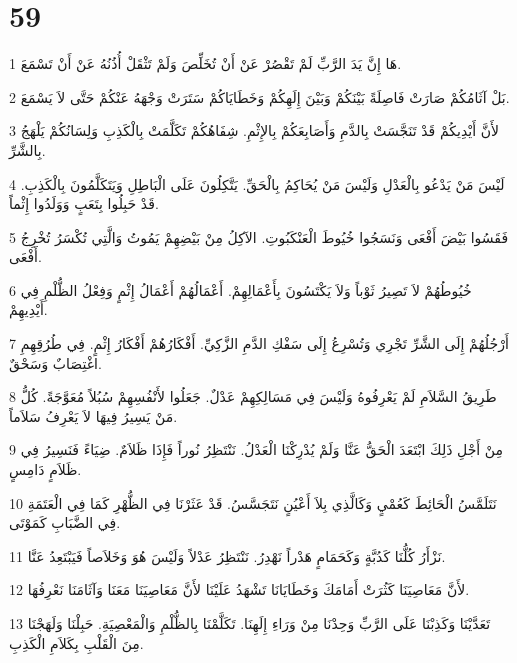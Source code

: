 \chapter{59}

\par 1 هَا إِنَّ يَدَ الرَّبِّ لَمْ تَقْصُرْ عَنْ أَنْ تُخَلِّصَ وَلَمْ تَثْقَلْ أُذُنُهُ عَنْ أَنْ تَسْمَعَ.
\par 2 بَلْ آثَامُكُمْ صَارَتْ فَاصِلَةً بَيْنَكُمْ وَبَيْنَ إِلَهِكُمْ وَخَطَايَاكُمْ سَتَرَتْ وَجْهَهُ عَنْكُمْ حَتَّى لاَ يَسْمَعَ.
\par 3 لأَنَّ أَيْدِيكُمْ قَدْ تَنَجَّسَتْ بِالدَّمِ وَأَصَابِعَكُمْ بِالإِثْمِ. شِفَاهُكُمْ تَكَلَّمَتْ بِالْكَذِبِ وَلِسَانُكُمْ يَلْهَجُ بِالشَّرِّ.
\par 4 لَيْسَ مَنْ يَدْعُو بِالْعَدْلِ وَلَيْسَ مَنْ يُحَاكِمُ بِالْحَقِّ. يَتَّكِلُونَ عَلَى الْبَاطِلِ وَيَتَكَلَّمُونَ بِالْكَذِبِ. قَدْ حَبِلُوا بِتَعَبٍ وَوَلَدُوا إِثْماً.
\par 5 فَقَسُوا بَيْضَ أَفْعَى وَنَسَجُوا خُيُوطَ الْعَنْكَبُوتِ. الآكِلُ مِنْ بَيْضِهِمْ يَمُوتُ وَالَّتِي تُكْسَرُ تُخْرِجُ أَفْعَى.
\par 6 خُيُوطُهُمْ لاَ تَصِيرُ ثَوْباً وَلاَ يَكْتَسُونَ بِأَعْمَالِهِمْ. أَعْمَالُهُمْ أَعْمَالُ إِثْمٍ وَفِعْلُ الظُّلْمِ فِي أَيْدِيهِمْ.
\par 7 أَرْجُلُهُمْ إِلَى الشَّرِّ تَجْرِي وَتُسْرِعُ إِلَى سَفْكِ الدَّمِ الزَّكِيِّ. أَفْكَارُهُمْ أَفْكَارُ إِثْمٍ. فِي طُرُقِهِمِ اغْتِصَابٌ وَسَحْقٌ.
\par 8 طَرِيقُ السَّلاَمِ لَمْ يَعْرِفُوهُ وَلَيْسَ فِي مَسَالِكِهِمْ عَدْلٌ. جَعَلُوا لأَنْفُسِهِمْ سُبُلاً مُعَوَّجَةً. كُلُّ مَنْ يَسِيرُ فِيهَا لاَ يَعْرِفُ سَلاَماً.
\par 9 مِنْ أَجْلِ ذَلِكَ ابْتَعَدَ الْحَقُّ عَنَّا وَلَمْ يُدْرِكْنَا الْعَدْلُ. نَنْتَظِرُ نُوراً فَإِذَا ظَلاَمٌ. ضِيَاءً فَنَسِيرُ فِي ظَلاَمٍ دَامِسٍ.
\par 10 نَتَلَمَّسُ الْحَائِطَ كَعُمْيٍ وَكَالَّذِي بِلاَ أَعْيُنٍ نَتَجَسَّسُ. قَدْ عَثَرْنَا فِي الظُّهْرِ كَمَا فِي الْعَتَمَةِ فِي الضَّبَابِ كَمَوْتَى.
\par 11 نَزْأَرُ كُلُّنَا كَدُبَّةٍ وَكَحَمَامٍ هَدْراً نَهْدِرُ. نَنْتَظِرُ عَدْلاً وَلَيْسَ هُوَ وَخَلاَصاً فَيَبْتَعِدُ عَنَّا.
\par 12 لأَنَّ مَعَاصِيَنَا كَثُرَتْ أَمَامَكَ وَخَطَايَانَا تَشْهَدُ عَلَيْنَا لأَنَّ مَعَاصِيَنَا مَعَنَا وَآثَامَنَا نَعْرِفُهَا.
\par 13 تَعَدَّيْنَا وَكَذِبْنَا عَلَى الرَّبِّ وَحِدْنَا مِنْ وَرَاءِ إِلَهِنَا. تَكَلَّمْنَا بِالظُّلْمِ وَالْمَعْصِيَةِ. حَبِلْنَا وَلَهَجْنَا مِنَ الْقَلْبِ بِكَلاَمِ الْكَذِبِ.
